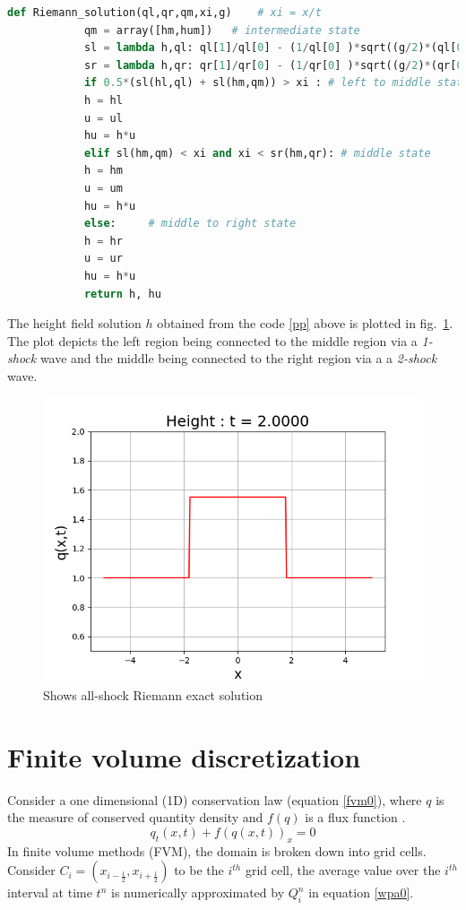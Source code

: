 \documentclass[11pt,a4paper]{article}
\begin{document}
	\begin{small}
		\begin{lstlisting}[language=Python, caption=Python code describing how the two shock case solution is obtained after the first time step.,label = pp]
			def Riemann_solution(ql,qr,qm,xi,g)    # xi = x/t
			qm = array([hm,hum])   # intermediate state
			sl = lambda h,ql: ql[1]/ql[0] - (1/ql[0] )*sqrt((g/2)*(ql[0]*h*(ql[0]+h)))
			sr = lambda h,qr: qr[1]/qr[0] - (1/qr[0] )*sqrt((g/2)*(qr[0]*h*(qr[0]+h))) 
			if 0.5*(sl(hl,ql) + sl(hm,qm)) > xi : # left to middle state
			h = hl
			u = ul
			hu = h*u   	
			elif sl(hm,qm) < xi and xi < sr(hm,qr): # middle state
			h = hm
			u = um
			hu = h*u
			else:     # middle to right state
			h = hr
			u = ur
			hu = h*u
			return h, hu
		\end{lstlisting}
	\end{small}
	
	The height field solution $h$ obtained from the code \ref{pp} above is plotted in fig.~\ref{fig:2-shock}. The plot depicts the left region being connected to the middle region via a {\em 1-shock } wave and the middle  being connected to the right region via a a {\em 2-shock } wave.
	
	\begin{figure}[H]
		\centering
		\includegraphics[width=0.5\linewidth]{images/2-shock}
		\caption{Shows all-shock Riemann exact solution }
		\label{fig:2-shock}
	\end{figure}
	
	
	\section{Finite volume discretization}
	Consider a one dimensional (1D) conservation law  (equation \eqref{fvm0}),  where $q$ is the measure of conserved quantity density and $f(q)$ is a flux function \cite{ge:2011}.
	\begin{equation}
		q_{t}(x,t) + f(q(x,t))_{x} = 0
		\label{fvm0}
	\end{equation}	
	In finite volume methods (FVM), the domain is broken down into grid cells. Consider $C_{i} = (x_{i-\frac{1}{2}},x_{i+\frac{1}{2}})$ to be the $i^{th}$ grid cell, the average value over the $i^{th}$ interval at time $t^{n}$ is numerically approximated by $Q_{i}^{n}$ in equation \eqref{wpa0}.
	
\end{document}
